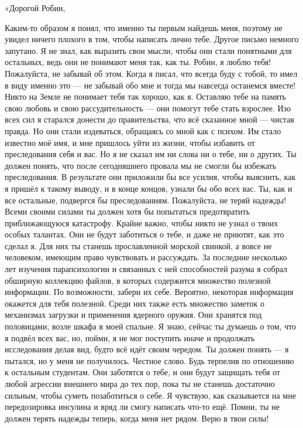 \documentclass[a4paper,12pt]{book}
\begin{document}
	«Дорогой Робин,

	Каким-то образом я понял, что именно ты первым найдешь меня, поэтому не увидел ничего плохого в том, чтобы написать лично тебе. Другое письмо немного запутано. Я не знал, как выразить свои мысли, чтобы они стали понятными для остальных, ведь они не понимают меня так, как ты. Робин, я люблю тебя! Пожалуйста, не забывай об этом. Когда я писал, что всегда буду с тобой, то имел в виду именно это — не забывай обо мне и тогда мы навсегда останемся вместе! Никто на Земле не понимает тебя так хорошо, как я. Оставляю тебе на память свою любовь и свою рассудительность — они помогут тебе стать взрослее.
	Изо всех сил я старался донести до правительства, что всё сказанное мной — чистая правда. Но они стали издеваться, обращаясь со мной как с психом. Им стало известно моё имя, и мне пришлось уйти из жизни, чтобы избавить от преследования себя и вас. Но я не сказал им ни слова ни о тебе, ни о других.
	Ты должен понять, что после сегодняшнего провала мы не смогли бы избежать преследования. В результате они приложили бы все усилия, чтобы выяснить, как я пришёл к такому выводу, и в конце концов, узнали бы обо всех вас. Ты, как и все остальные, подвергся бы преследованиям.
	Пожалуйста, не теряй надежды! Всеми своими силами ты должен хотя бы попытаться предотвратить приближающуюся катастрофу. Крайне важно, чтобы никто не узнал о твоих особых талантах. Они не будут заботиться о тебе, и даже не приютят, как это сделал я. Для них ты станешь прославленной морской свинкой, а вовсе не человеком, имеющим право чувствовать и рассуждать.
	За последние несколько лет изучения парапсихологии и связанных с ней способностей разума я собрал обширную коллекцию файлов, в которых содержится множество полезной информации. По возможности, забери их себе. Вероятно, некоторая информация окажется для тебя полезной. Среди них также есть множество заметок о механизмах загрузки и применения ядерного оружия. Они хранятся под половицами, возле шкафа в моей спальне.
	Я знаю, сейчас ты думаешь о том, что я подвёл всех вас, но, пойми, я не мог поступить иначе и продолжать исследования делая вид, будто всё идёт своим чередом. Ты должен понять — я пытался, но у меня не получилось. Честное слово.
	Будь терпелив по отношению к остальным студентам. Они заботятся о тебе, и они будут защищать тебя от любой агрессии внешнего мира до тех пор, пока ты не станешь достаточно сильным, чтобы суметь позаботиться о себе.
	Я чувствую, как сказывается на мне передозировка инсулина и вряд ли смогу написать что-то ещё.
	Помни, ты не должен терять надежды теперь, когда меня нет рядом. Верю в твои силы!
	
\end{document}
